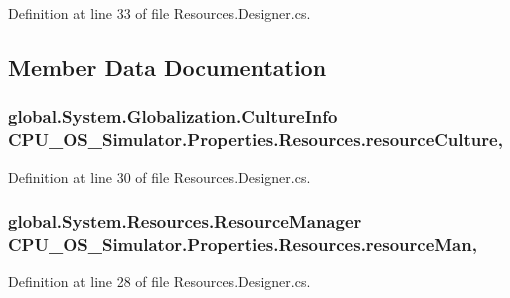 Definition at line 33 of file Resources.\+Designer.\+cs.



\subsection{Member Data Documentation}
\hypertarget{class_c_p_u___o_s___simulator_1_1_properties_1_1_resources_a08c56eb92abfbde7a18635199c6f28cf}{}
\subsubsection[{resource\+Culture}]{\setlength{\rightskip}{0pt plus 5cm}global.\+System.\+Globalization.\+Culture\+Info C\+P\+U\+\_\+\+O\+S\+\_\+\+Simulator.\+Properties.\+Resources.\+resource\+Culture\hspace{0.3cm}{\ttfamily [static]}, {\ttfamily [private]}}\label{class_c_p_u___o_s___simulator_1_1_properties_1_1_resources_a08c56eb92abfbde7a18635199c6f28cf}


Definition at line 30 of file Resources.\+Designer.\+cs.

\hypertarget{class_c_p_u___o_s___simulator_1_1_properties_1_1_resources_abc80953d3d68ed223e07e8efabc17b79}{}
\subsubsection[{resource\+Man}]{\setlength{\rightskip}{0pt plus 5cm}global.\+System.\+Resources.\+Resource\+Manager C\+P\+U\+\_\+\+O\+S\+\_\+\+Simulator.\+Properties.\+Resources.\+resource\+Man\hspace{0.3cm}{\ttfamily [static]}, {\ttfamily [private]}}\label{class_c_p_u___o_s___simulator_1_1_properties_1_1_resources_abc80953d3d68ed223e07e8efabc17b79}


Definition at line 28 of file Resources.\+Designer.\+cs.



